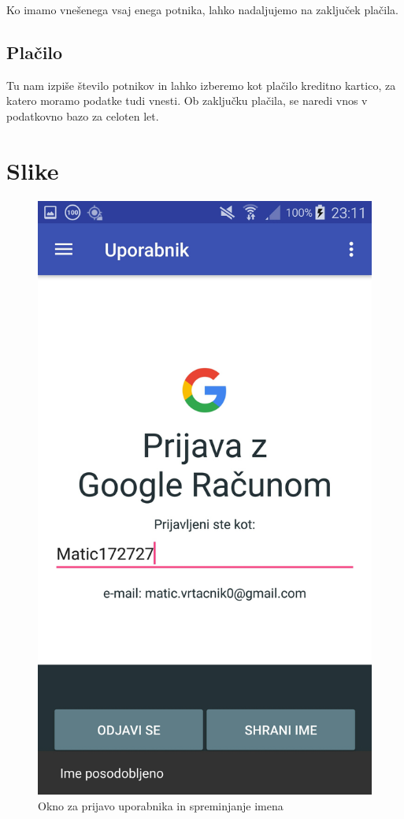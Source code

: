 \documentclass[11pt,a4paper]{article}
\begin{document}
Ko imamo vnešenega vsaj enega potnika, lahko nadaljujemo na zaključek plačila.

\subsection{Plačilo}
Tu nam izpiše število potnikov in lahko izberemo kot plačilo kreditno kartico, za katero moramo podatke tudi vnesti.
Ob zaključku plačila, se naredi vnos v podatkovno bazo za celoten let.


\section{Slike}

\begin{figure}[htb]
\centerline{\includegraphics[width=1.0\textwidth]{GUI/login.jpg}}
\caption{Okno za prijavo uporabnika in spreminjanje imena}
\label{sl:koncept}
\end{figure}
\end{document}
